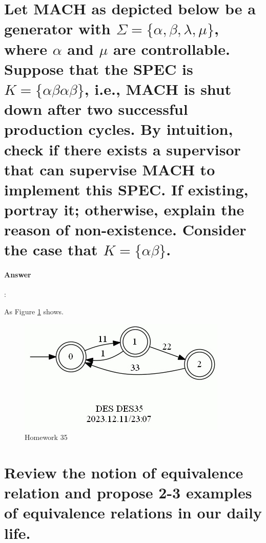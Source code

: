 \documentclass{article}
\begin{document}
\section{Let MACH as depicted below be a generator with $\Sigma = \{\alpha , \beta , \lambda , \mu \}$, where $\alpha$ and $\mu$ are controllable. Suppose that the SPEC is $K = \{\alpha\beta\alpha\beta\}$, i.e., MACH is shut down after two successful production cycles. By intuition, check if there exists a supervisor that can supervise MACH to implement this SPEC. If existing, portray it; otherwise, explain the reason of non-existence. Consider the case that $K = \{\alpha\beta\}$.}

\paragraph{Answer}:

As Figure \ref{fig:des35} shows.

\begin{figure}[h]
  \centering
  \includegraphics{assets/DES35.jpg}
  \caption{Homework 35}
  \label{fig:des35}
\end{figure}

\section{Review the notion of equivalence relation and propose 2-3 examples of equivalence relations in our daily life.}
\end{document}
